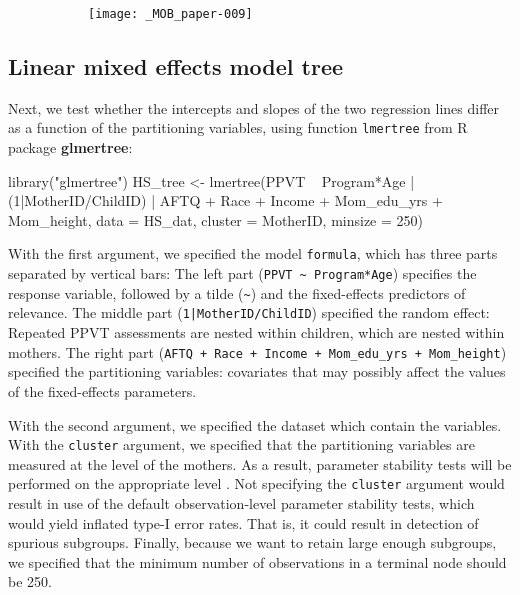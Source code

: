 \documentclass[doc,floatsintext,natbib]{apa7}
\begin{document}
\begin{figure}%
\caption{}
\begin{subfigure}{.7\textwidth}
\texttt{[image: \_MOB\_paper-009]}
\end{subfigure}
\label{fig:global_lmm}
\end{figure}%

\FloatBarrier
\subsection{Linear mixed effects model tree}

Next, we test whether the intercepts and slopes of the two regression lines differ as a function of the partitioning variables, using function \verb|lmertree| from R package \textbf{glmertree}:

\begin{Schunk}
\begin{Sinput}
 library("glmertree")
 HS_tree <- lmertree(PPVT ~ Program*Age | (1|MotherID/ChildID) | AFTQ + Race + 
                       Income + Mom_edu_yrs + Mom_height, 
                     data = HS_dat, cluster = MotherID, minsize = 250)
\end{Sinput}
\end{Schunk}

With the first argument, we specified the model \verb|formula|, which has three parts separated by vertical bars: The left part (\verb|PPVT ~ Program*Age|) specifies the response variable, followed by a tilde (\verb|~|) and the fixed-effects predictors of relevance. The middle part (\texttt{1|MotherID/ChildID}) specified the random effect: Repeated PPVT assessments are nested within children, which are nested within mothers. The right part (\verb|AFTQ + Race + Income + Mom_edu_yrs + Mom_height|) specified the partitioning variables: covariates that may possibly affect the values of the fixed-effects parameters. 

With the second argument, we specified the dataset which contain the variables. With the \texttt{cluster} argument, we specified that the partitioning variables are measured at the level of the mothers. As a result, parameter stability tests will be performed on the appropriate level \citep{FokkyZeil23}. Not specifying the \texttt{cluster} argument would result in use of the default observation-level parameter stability tests, which would yield inflated type-I error rates. That is, it could result in detection of spurious subgroups. Finally, because we want to retain large enough subgroups, we specified that the minimum number of observations in a terminal node should be 250.
\end{document}
